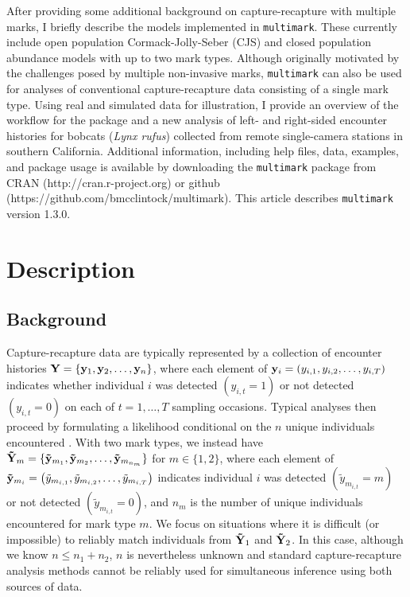 \documentclass[12pt]{article}
\begin{document}
After providing some additional background on capture-recapture with multiple marks, I briefly describe the models implemented in \verb|multimark|. These currently include open population Cormack-Jolly-Seber (CJS) and closed population abundance models \citep[e.g.][]{WilliamsEtAl2002} with up to two mark types. Although originally motivated by the challenges posed by multiple non-invasive marks, \verb|multimark| can also be used for analyses of conventional capture-recapture data consisting of a single mark type. Using real and simulated data for illustration, I provide an overview of the workflow for the package and a new analysis of left- and right-sided encounter histories for bobcats ({\it Lynx rufus}) collected from remote single-camera stations in southern California. Additional information, including help files, data, examples, and package usage is available by downloading the \verb|multimark| package from CRAN (http://cran.r-project.org) or github (https://github.com/bmcclintock/multimark). This article describes \verb|multimark| version 1.3.0.

\section{Description}
\subsection{Background}

Capture-recapture data are typically represented by a collection of encounter histories ${\bf Y} = \{{\bf y}_1,{\bf y}_2,\ldots,{\bf y}_n\}$, where each element of ${\bf y}_i=\left(y_{i,1},y_{i,2},\ldots,y_{i,T}\right)$ indicates whether individual $i$ was detected $(y_{i,t}=1)$ or not detected $(y_{i,t}=0)$ on each of $t=1,\dots,T$ sampling occasions. Typical analyses then proceed by formulating a likelihood conditional on the $n$ unique individuals encountered \citep[e.g.][]{WilliamsEtAl2002}. With two mark types, we instead have ${\bf {\tilde Y}}_m = \{{\bf {\tilde y}}_{m_1},{\bf {\tilde y}}_{m_2},\ldots,{\bf {\tilde y}}_{m_{n_m}}\}$ for $m \in \{1,2\}$, where each element of ${\bf {\tilde y}}_{m_i}=\left({\tilde y}_{m_{i,1}},{\tilde y}_{m_{i,2}},\ldots,{\tilde y}_{m_{i,T}}\right)$ indicates individual $i$ was detected $({\tilde y}_{m_{i,t}}=m)$ or not detected $({\tilde y}_{m_{i,t}}=0)$, and $n_m$ is the number of unique individuals encountered for mark type $m$. We focus on situations where it is difficult (or impossible) to reliably match individuals from ${\bf {\tilde Y}}_1$ and ${\bf {\tilde Y}}_2$. In this case, although we know $n \le n_1+n_2$, $n$ is nevertheless unknown and standard capture-recapture analysis methods cannot be reliably used for simultaneous inference using both sources of data.
\end{document}
